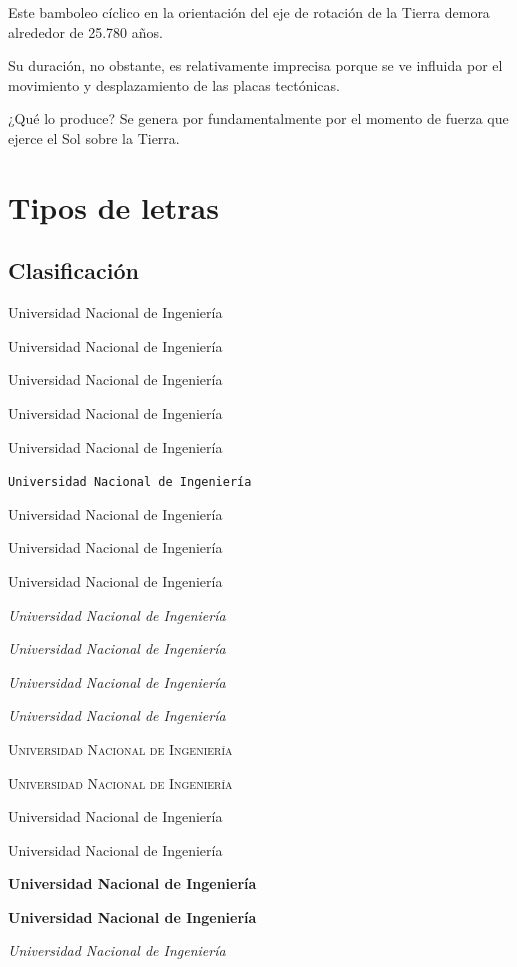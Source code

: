 \documentclass[12pt,a4paper]{article}
\begin{document}
Este bamboleo cíclico en la orientación del eje de rotación de la Tierra demora alrededor de 25.780 años. 

Su duración, no obstante, es relativamente imprecisa porque se ve influida por el movimiento y desplazamiento 
de las placas tectónicas.

¿Qué lo produce? Se genera por fundamentalmente por el momento de fuerza que ejerce el Sol sobre la Tierra. 


\section{Tipos de letras}
\subsection{Clasificación}

Universidad Nacional de Ingeniería

\textrm{Universidad Nacional de Ingeniería}

{\rmfamily Universidad Nacional de Ingeniería}

\textsf{Universidad Nacional de Ingeniería}

{\sffamily Universidad Nacional de Ingeniería}

\texttt{Universidad Nacional de Ingeniería}

{\ttfamily Universidad Nacional de Ingeniería}

\textup{Universidad Nacional de Ingeniería}

{\upshape Universidad Nacional de Ingeniería}

\textit{Universidad Nacional de Ingeniería}

{\itshape Universidad Nacional de Ingeniería \/}

\textsl{Universidad Nacional de Ingeniería}

{\slshape Universidad Nacional de Ingeniería}

\textsc{Universidad Nacional de Ingeniería}

{\scshape Universidad Nacional de Ingeniería}

\textmd{Universidad Nacional de Ingeniería}

{\mdseries Universidad Nacional de Ingeniería}

\textbf{Universidad Nacional de Ingeniería}

{\bfseries Universidad Nacional de Ingeniería}

\emph{Universidad Nacional de Ingeniería}
\end{document}
